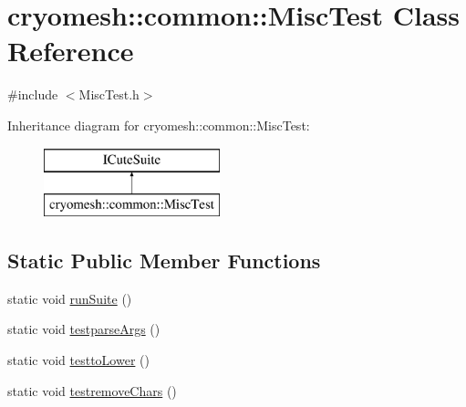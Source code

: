 \hypertarget{classcryomesh_1_1common_1_1_misc_test}{
\section{cryomesh::common::MiscTest Class Reference}
\label{classcryomesh_1_1common_1_1_misc_test}
}


{\ttfamily \#include $<$MiscTest.h$>$}

Inheritance diagram for cryomesh::common::MiscTest:\begin{figure}[H]
\begin{center}
\leavevmode
\includegraphics[height=2.000000cm]{classcryomesh_1_1common_1_1_misc_test}
\end{center}
\end{figure}
\subsection*{Static Public Member Functions}
\begin{DoxyCompactItemize}
\item 
static void \hyperlink{classcryomesh_1_1common_1_1_misc_test_acc5b0cd2668fa5ffd633a42e779f488d}{runSuite} ()
\item 
static void \hyperlink{classcryomesh_1_1common_1_1_misc_test_af2e14bca887d72af8846f558452612ea}{testparseArgs} ()
\item 
static void \hyperlink{classcryomesh_1_1common_1_1_misc_test_a89eb54f0a463bf2e331fde7eec992404}{testtoLower} ()
\item 
static void \hyperlink{classcryomesh_1_1common_1_1_misc_test_a9a69bbb484052a9d8cd57cd1c3ecef33}{testremoveChars} ()
\end{DoxyCompactItemize}


